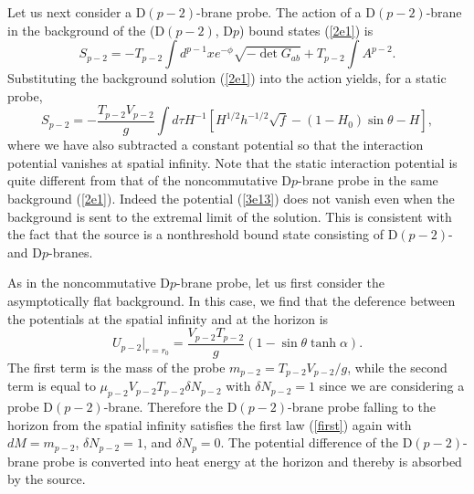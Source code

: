 \documentclass[a4paper,12pt]{article}
\begin{document}
Let us next consider a D$(p-2)$-brane probe. The action of a D$(p-2)$-brane
in the background of the (D$(p-2)$, D$p$) bound states (\ref{2e1}) is
\begin{equation}
\label{dp-2action}
S_{p-2}=-T_{p-2}\int d^{p-1}x e^{-\phi}\sqrt{-\det G_{ab}}+T_{p-2}
\int A^{p-2}.
\end{equation}
Substituting the background solution (\ref{2e1}) into the action yields,
for a static probe,
\begin{equation}
\label{3e13}
S_{p-2}=-\frac{T_{p-2}V_{p-2}}{g}\int d\tau H^{-1}\left [H^{1/2}h^{-1/2}
\sqrt{f} -(1-H_0)\sin\theta -H \right ],
\end{equation}
where we have also subtracted a constant potential so that the interaction
potential vanishes at spatial infinity. Note that the static interaction
potential is quite different from that of the noncommutative D$p$-brane probe
in the same background (\ref{2e1}). Indeed the potential (\ref{3e13})
does not vanish even when the background is sent to the extremal limit of the
solution. This is consistent with the fact that the source is a nonthreshold
bound state consisting of D$(p-2)$- and D$p$-branes.

As in the noncommutative D$p$-brane probe, let us first consider the
asymptotically flat background. In this case, we find that the deference
between the potentials at the spatial infinity and at the horizon is
\begin{equation}
\label{3e14}
U_{p-2}|_{r=r_0} =\frac{V_{p-2}T_{p-2}}{g}\left (1
       -\sin\theta \tanh\alpha \right).
\end{equation}
The first term is the mass of the probe $m_{p-2}=T_{p-2}V_{p-2}/g$, while
the second term is equal to $\mu_{p-2}V_{p-2}T_{p-2}\delta N_{p-2}$
with $\delta N_{p-2}=1$ since we are considering a probe D$(p-2)$-brane.
Therefore the D$(p-2)$-brane probe falling to the horizon from the spatial
infinity satisfies the first law (\ref{first}) again with $dM=m_{p-2}$,
$\delta N_{p-2}=1$, and $\delta N_p=0$. The potential difference of the
D$(p-2)$-brane probe is converted into heat energy at the horizon and
thereby is absorbed by the source.
\end{document}
